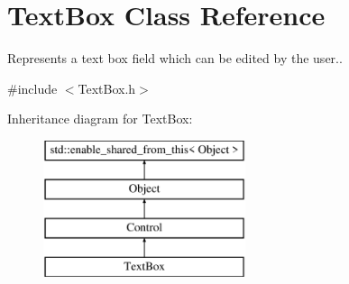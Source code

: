 \hypertarget{class_text_box}{}\section{Text\+Box Class Reference}
\label{class_text_box}


Represents a text box field which can be edited by the user..  




{\ttfamily \#include $<$Text\+Box.\+h$>$}

Inheritance diagram for Text\+Box\+:\begin{figure}[H]
\begin{center}
\leavevmode
\includegraphics[height=4.000000cm]{class_text_box}
\end{center}
\end{figure}
